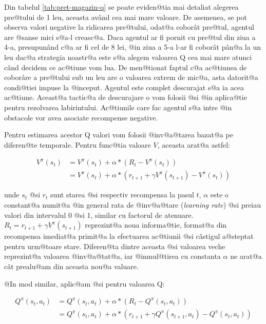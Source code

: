 Din tabelul \ref{tab:pret-magazin-q} se poate eviden@tia mai detaliat alegerea pre@tului de 1 leu, aceasta av\^and cea mai mare valoare. De asemenea, se pot observa valori negative la ridicarea pre@tului, odat@a cobor\^ at pre@tul, agentul are @sanse mici s@a-l creasc@a. Daca agentul ar fi pornit cu pre@tul din ziua a 4-a, presupun\^ and c@a ar fi cel de 8 lei, @in ziua a 5-a l-ar fi cobor\^ at p\^ an@a la un leu dac@a strategia noastr@a este s@a alegem valoarea Q cea mai mare atunci c\^and decidem ce ac@tiune vom lua. De men@tionat faptul c@a ac@tiunea de cobor\^ are a pre@tului sub un leu are o valoarea extrem de mic@a, asta datorit@a condi@tiei impuse la @inceput. Agentul este complet descurajat s@a ia acea ac@tiune. Aceast@a tactic@a de descurajare o vom folosii @si @in aplica@tie pentru rezolvarea labirintului. Ac@tiunile care fac agentul s@a intre @in obstacole vor avea asociate recompense negative.

Pentru estimarea acestor Q valori vom folosii @inv@a@tarea bazat@a pe diferen@te temporale. Pentru func@tia valoare $V$, aceasta arat@a astfel:



\begin{align}
	V^{\pi}(s_t) & =  V^{\pi}(s_t) + \alpha * \left( R_t - V^{\pi}(s_t) \right) \\
	 & =  V^{\pi}(s_t) + \alpha * \left( r_{t+1} + \gamma V^{\pi}(s_{t+1})  - V^{\pi}(s_t) \right)
\end{align}

\noindent unde $s_t$ @si $r_t$ sunt starea @si respectiv recompensa la pasul $t$, $\alpha$ este o constant@a numit@a @in general rata de @inv@a@tare (\textsl{learning rate}) @si preiau valori din intervalul 0 @si 1, similar cu factorul de atenuare. $R_t = r_{t+1} + \gamma V^{\pi}(s_{t+1}) $ reprezint@a noua informa@tie, format@a din recompensa imediat@a primit@a la efectuarea ac@tiunii @si c\^ astigul a@steptat pentru urm@toare stare. Diferen@ta dintre aceasta @si valoarea veche reprezint@a valoarea @inv@a@tat@a, iar @inmul@tirea cu constanta $\alpha$ ne arat@a c\^ at prealu@am din aceasta nou@a valuare.

@In mod similar, aplic@am @si pentru valoarea Q:

\begin{align}
	Q^{\pi}(s_t, a_t) & =  Q^{\pi}(s_t, a_t) + \alpha * \left( R_t - Q^{\pi}(s_t, a_t) \right) \\
	 & =  Q^{\pi}(s_t, a_t) + \alpha * \left( r_{t+1} + \gamma Q^{\pi}(s_{t+1}, a_t)  - Q^{\pi}(s_t, a_t) \right)
\end{align}

